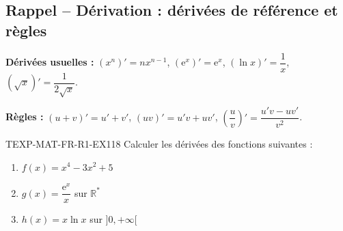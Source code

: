 

\subsection*{Rappel -- Dérivation : dérivées de référence et règles}

\textbf{Dérivées usuelles :} $(x^n)' = n x^{n-1}$, $(\mathrm{e}^x)' = \mathrm{e}^x$, $(\ln x)' = \dfrac{1}{x}$, $(\sqrt{x})' = \dfrac{1}{2\sqrt{x}}$.

\textbf{Règles :} $(u+v)' = u' + v'$, $(uv)' = u'v + uv'$, $\left(\dfrac{u}{v}\right)' = \dfrac{u'v - uv'}{v^2}$.

\begin{exercice}{TEXP-MAT-FR-R1-EX1}{1}{8}
Calculer les dérivées des fonctions suivantes :
\begin{enumerate}
  \item $f(x) = x^4 - 3x^2 + 5$
  \item $g(x) = \dfrac{\mathrm{e}^x}{x}$ sur $\mathbb{R}^*$
  \item $h(x) = x \ln x$ sur $]0, +\infty[$
\end{enumerate}
\end{exercice}


